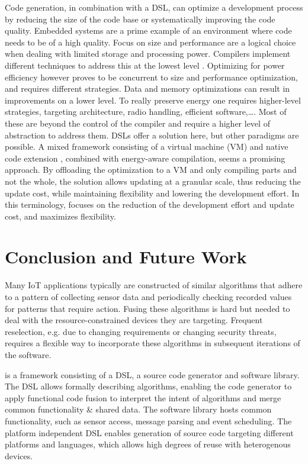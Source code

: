 \documentclass[3p,times,procedia]{elsarticle}
\begin{document}
Code generation, in combination with a DSL, can optimize a development process
by reducing the size of the code base or systematically improving the code
quality. Embedded systems are a prime example of an environment where code
needs to be of a high quality. Focus on size and performance are a logical
choice when dealing with limited storage and processing power. Compilers
implement different techniques to address this at the lowest level
\cite{marwedel2002code}. Optimizing for power efficiency however proves to be
concurrent to size and performance optimization, and requires different
strategies. Data and memory optimizations \cite{panda2001data} can result in
improvements on a lower level. To really preserve energy one requires
higher-level strategies, targeting architecture, radio handling, efficient
software,\dots \cite{naik2001software}. Most of these are beyond the control of
the compiler and require a higher level of abstraction to address them. DSLs
offer a solution here, but other paradigms are possible. A mixed framework
consisting of a virtual machine (VM) and native code extension
\cite{sadilek2007energy}, combined with energy-aware compilation, seems a
promising approach. By offloading the optimization to a VM and only compiling
parts and not the whole, the solution allows updating at a granular scale, thus
reducing the update cost, while maintaining flexibility and lowering the
development effort. In this terminology, \FOO focuses on the reduction of the
development effort and update cost, and maximizes flexibility.

\section{Conclusion and Future Work}
\label{conclusion}

Many IoT applications typically are constructed of similar algorithms that
adhere to a pattern of collecting sensor data and periodically checking
recorded values for patterns that require action. Fusing these algorithms is
hard but needed to deal with the resource-constrained devices they are
targeting. Frequent reselection, e.g. due to changing requirements or changing
security threats, requires a flexible way to incorporate these algorithms in
subsequent iterations of the software.

\FOO is a framework consisting of a DSL, a source code generator and software
library. The DSL allows formally describing algorithms, enabling the code
generator to apply functional code fusion to interpret the intent of algorithms
and merge common functionality \& shared data. The software library hosts
common functionality, such as sensor access, message parsing and event
scheduling. The platform independent DSL enables generation of source code
targeting different platforms and languages, which allows high degrees of reuse
with heterogenous devices.
\end{document}
